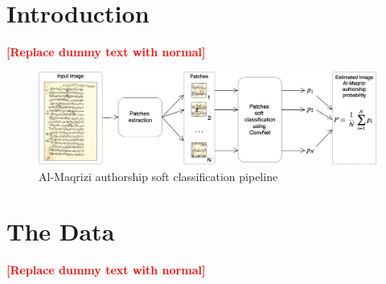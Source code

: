 \documentclass[conference,a4paper,twocolumn]{IEEEtran}
\newcommand{\todo}[1]{\textcolor{red}{\textbf{[#1]}}} %
\begin{document}




\maketitle



\begin{abstract}
\lipsum[5]
\end{abstract}


%
\IEEEpeerreviewmaketitle


\section{Introduction}
\label{sec:introduction}
\todo{Replace dummy text with normal}
\lipsum[6-10]
	

\begin{figure}[!t]
	\center
  \includegraphics[width=\textwidth]{figures/Al-Maqrizi_classification_pipeline.png}
  \caption{Al-Maqrizi authorship soft classification pipeline}
  \label{fig:pipeline}
\end{figure}	
	
\section{The Data}
\label{sec:the_data}
\todo{Replace dummy text with normal}
\lipsum[11-14]
\end{document}
